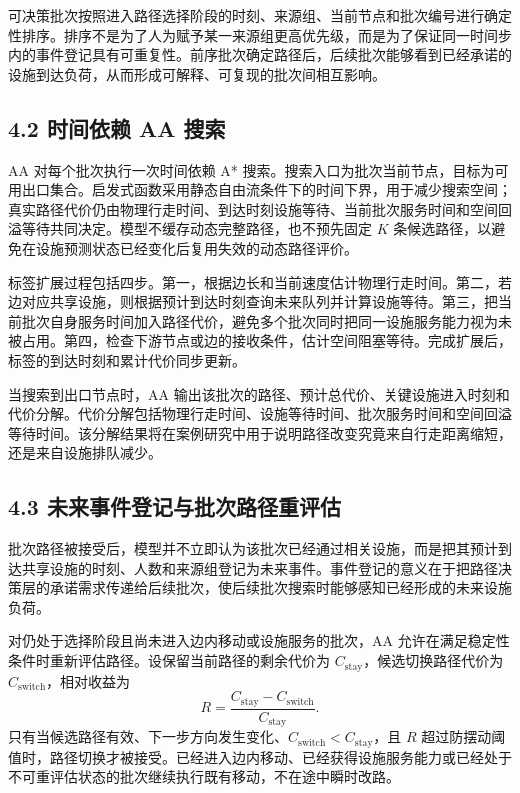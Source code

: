 \documentclass[UTF8,a4paper,12pt]{ctexart}
\begin{document}
可决策批次按照进入路径选择阶段的时刻、来源组、当前节点和批次编号进行确定性排序。排序不是为了人为赋予某一来源组更高优先级，而是为了保证同一时间步内的事件登记具有可重复性。前序批次确定路径后，后续批次能够看到已经承诺的设施到达负荷，从而形成可解释、可复现的批次间相互影响。

\subsection{4.2 时间依赖 AA 搜索}

AA 对每个批次执行一次时间依赖 A* 搜索。搜索入口为批次当前节点，目标为可用出口集合。启发式函数采用静态自由流条件下的时间下界，用于减少搜索空间；真实路径代价仍由物理行走时间、到达时刻设施等待、当前批次服务时间和空间回溢等待共同决定。模型不缓存动态完整路径，也不预先固定 \(K\) 条候选路径，以避免在设施预测状态已经变化后复用失效的动态路径评价。

标签扩展过程包括四步。第一，根据边长和当前速度估计物理行走时间。第二，若边对应共享设施，则根据预计到达时刻查询未来队列并计算设施等待。第三，把当前批次自身服务时间加入路径代价，避免多个批次同时把同一设施服务能力视为未被占用。第四，检查下游节点或边的接收条件，估计空间阻塞等待。完成扩展后，标签的到达时刻和累计代价同步更新。

当搜索到出口节点时，AA 输出该批次的路径、预计总代价、关键设施进入时刻和代价分解。代价分解包括物理行走时间、设施等待时间、批次服务时间和空间回溢等待时间。该分解结果将在案例研究中用于说明路径改变究竟来自行走距离缩短，还是来自设施排队减少。

\subsection{4.3 未来事件登记与批次路径重评估}

批次路径被接受后，模型并不立即认为该批次已经通过相关设施，而是把其预计到达共享设施的时刻、人数和来源组登记为未来事件。事件登记的意义在于把路径决策层的承诺需求传递给后续批次，使后续批次搜索时能够感知已经形成的未来设施负荷。

对仍处于选择阶段且尚未进入边内移动或设施服务的批次，AA 允许在满足稳定性条件时重新评估路径。设保留当前路径的剩余代价为 \(C_{\mathrm{stay}}\)，候选切换路径代价为 \(C_{\mathrm{switch}}\)，相对收益为
\[
R=\frac{C_{\mathrm{stay}}-C_{\mathrm{switch}}}{C_{\mathrm{stay}}}.
\]
只有当候选路径有效、下一步方向发生变化、\(C_{\mathrm{switch}}<C_{\mathrm{stay}}\)，且 \(R\) 超过防摆动阈值时，路径切换才被接受。已经进入边内移动、已经获得设施服务能力或已经处于不可重评估状态的批次继续执行既有移动，不在途中瞬时改路。
\end{document}
